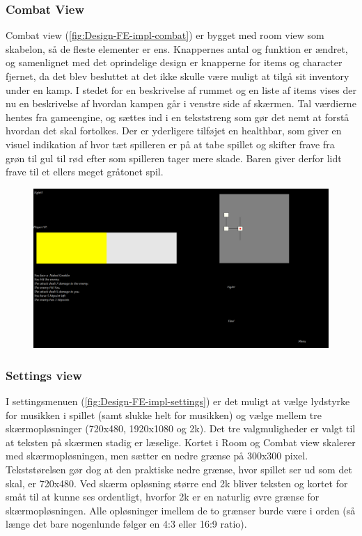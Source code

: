 \subsubsection{Combat View}

Combat view (\autoref{fig:Design-FE-impl-combat}) er bygget med room view som skabelon, så de fleste elementer er ens. Knappernes antal og funktion er ændret, og samenlignet med det oprindelige design er knapperne for items og character fjernet, da det blev besluttet at det ikke skulle være muligt at tilgå sit inventory under en kamp. I stedet for en beskrivelse af rummet og en liste af items vises der nu en beskrivelse af hvordan kampen går i venstre side af skærmen. Tal værdierne hentes fra gameengine, og sættes ind i en tekststreng som gør det nemt at forstå hvordan det skal fortolkes. Der er yderligere tilføjet en healthbar, som giver en visuel indikation af hvor tæt spilleren er på at tabe spillet og skifter frave fra grøn til gul til rød efter som spilleren tager mere skade. Baren giver derfor lidt frave til et ellers meget gråtonet spil.

\begin{figure}[h]
\centering
\includegraphics[width = \textwidth]{02-Body/Images/combat_final.PNG}
\caption{}
\label{fig:Design-FE-impl-combat}
\end{figure}

\subsubsection{Settings view}

I settingsmenuen (\autoref{fig:Design-FE-impl-settings}) er det muligt at vælge lydstyrke for musikken i spillet (samt slukke helt for musikken) og vælge mellem tre skærmopløsninger (720x480, 1920x1080 og 2k). Det tre valgmuligheder er valgt til at teksten på skærmen stadig er læselige. Kortet i Room og Combat view skalerer med skærmopløsningen, men sætter en nedre grænse på 300x300 pixel. Tekststørelsen gør dog at den praktiske nedre grænse, hvor spillet ser ud som det skal, er 720x480. Ved skærm opløsning større end 2k bliver teksten og kortet for småt til at kunne ses ordentligt, hvorfor 2k er en naturlig øvre grænse for skærmopløsningen. Alle opløsninger imellem de to grænser burde være i orden (så længe det bare nogenlunde følger en 4:3 eller 16:9 ratio).\\

